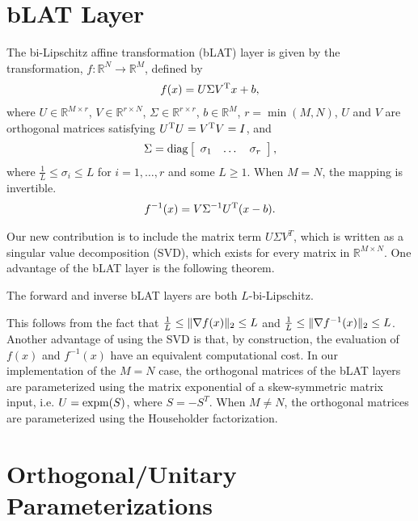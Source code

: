 \documentclass[12pt]{article}
\begin{document}
\section{bLAT Layer}
{ 
The bi-Lipschitz affine transformation (bLAT) layer 
is given by the transformation, $f:\mathbb{R}^{N}\rightarrow\mathbb{R}^{M}$,
defined by
\begin{align}
f(x) = U \Sigma V^{\rm T} x + b,
\end{align}
%
where 
$U\in\mathbb{R}^{M\times r}$,
$V\in\mathbb{R}^{r\times N}$,
$\Sigma\in\mathbb{R}^{r\times r}$,
$b\in\mathbb{R}^{M}$,
$r = \min(M, N)$,
$U$ and $V$ are orthogonal matrices satisfying 
$U^{\rm T} U = V^{\rm T} V = I$,
and 
\begin{align}
    \Sigma = {\rm diag}
    \left[\begin{array}{ccc} \sigma_1 & \dots & \sigma_r\end{array}\right],
\end{align}
%
where $\frac{1}{L} \le \sigma_i \le L$ for 
$i=1,\dots, r$ and some $L\ge 1$.
When $M=N$, the mapping is invertible.\label{def:blat}
\begin{align}
    f^{-1}(x) = V \Sigma^{-1} U^{\rm T} (x - b).
\end{align}
}

\medskip

\noindent Our new contribution is to include the
matrix term $U\Sigma V^T$, which is written as a 
singular value decomposition (SVD),
which exists for every matrix in $\mathbb{R}^{M\times N}$.
One advantage of the bLAT layer is the following theorem.

{\theorem The forward and 
inverse bLAT layers are both $L$-bi-Lipschitz.
}

\medskip

\noindent This follows from the fact that
$\frac{1}{L} \le \|\nabla f(x)\|_2 \le L$ and 
$\frac{1}{L} \le \|\nabla f^{-1}(x)\|_2 \le L$.
Another advantage of using the SVD is that,
by construction, the evaluation of 
$f(x)$ and $f^{-1}(x)$ have an equivalent computational cost.
In our implementation of the $M=N$ case,
the orthogonal matrices of the 
bLAT layers are parameterized using the matrix exponential 
of a skew-symmetric matrix input,
i.e. $U = {\rm expm}(S)$, where $S=-S^T$.
When $M\ne N$, the orthogonal matrices are parameterized
using the Householder factorization.

\section{Orthogonal/Unitary Parameterizations}
\end{document}
